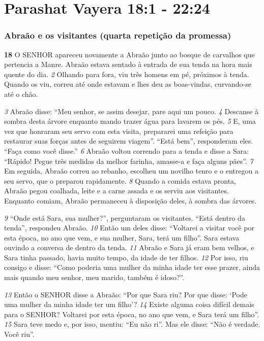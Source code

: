 \section*{Parashat Vayera 18:1 - 22:24}

\subsubsection*{Abraão e os visitantes (quarta repetição da promessa)}

\textbf{\large 18}
 O SENHOR apareceu novamente a Abraão junto ao bosque de carvalhos que
pertencia a Manre. Abraão estava sentado à entrada de sua tenda na hora mais
quente do dia. 
\textit{\tiny 2}
Olhando para fora, viu três homens em pé, próximos à tenda.
Quando os viu, correu até onde estavam e lhes deu as boas-vindas, curvando-se
até o chão.

\bigskip   
\textit{\tiny 3}
Abraão disse: “Meu senhor, se assim desejar, pare aqui um pouco. 
\textit{\tiny 4}
Descanse à
sombra desta árvore enquanto mando trazer água para lavarem os pés. 
\textit{\tiny 5}
E, uma
vez que honraram seu servo com esta visita, prepararei uma refeição para
restaurar suas forças antes de seguirem viagem”.
   “Está bem”, responderam eles. “Faça como você disse.”
\textit{\tiny 6}
Abraão voltou correndo para a tenda e disse a Sara: “Rápido! Pegue três
medidas da melhor farinha, amasse-a e faça alguns pães”. 
\textit{\tiny 7}
Em seguida, Abraão
correu ao rebanho, escolheu um novilho tenro e o entregou a seu servo, que o
preparou rapidamente. 
\textit{\tiny 8}
Quando a comida estava pronta, Abraão pegou coalhada,
leite e a carne assada e os serviu aos visitantes. Enquanto comiam, Abraão
permaneceu à disposição deles, à sombra das árvores.

\bigskip   
\textit{\tiny 9}
“Onde está Sara, sua mulher?”, perguntaram os visitantes.
   “Está dentro da tenda”, respondeu Abraão.
\textit{\tiny 10}
Então um deles disse: “Voltarei a visitar você por esta época, no ano que vem,
e sua mulher, Sara, terá um filho”.
   Sara estava ouvindo a conversa de dentro da tenda. 
\textit{\tiny 11}
Abraão e Sara já eram
bem velhos, e Sara tinha passado, havia muito tempo, da idade de ter filhos. 
\textit{\tiny 12}
Por
isso, riu consigo e disse: “Como poderia uma mulher da minha idade ter esse
prazer, ainda mais quando meu senhor, meu marido, também é idoso?”.

\bigskip   
\textit{\tiny 13}
Então o SENHOR disse a Abraão: “Por que Sara riu? Por que disse: ‘Pode uma
mulher da minha idade ter um filho’? 
\textit{\tiny 14}
Existe alguma coisa difícil demais para o
SENHOR? Voltarei por esta época, no ano que vem, e Sara terá um filho”.
\textit{\tiny 15}
Sara teve medo e, por isso, mentiu: “Eu não ri”.
   Mas ele disse: “Não é verdade. Você riu”.

